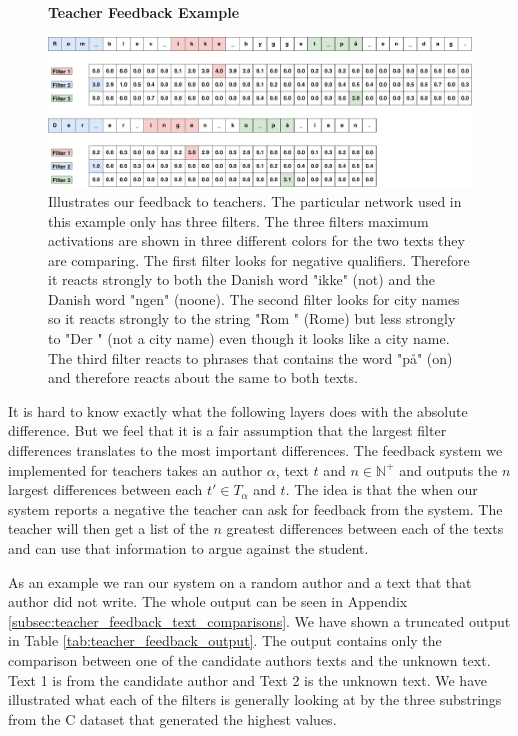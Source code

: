 \begin{figure}
    \centering
    \textbf{Teacher Feedback Example}\par\medskip
    \includegraphics[width=\textwidth]{./pictures/discussion/teacher_feedback_example}
    \caption{Illustrates our feedback to teachers. The
        particular network used in this example only has three filters. The
        three filters maximum activations are shown in three different colors
        for the two texts they are comparing. The first filter looks for
        negative qualifiers. Therefore it reacts strongly to both the Danish
        word "ikke" (not) and the Danish word "ngen" (noone). The second filter
        looks for city names so it reacts strongly to the string "Rom " (Rome)
        but less strongly to "Der " (not a city name) even though it looks like
        a city name. The third filter reacts to phrases that contains the word
        "p\aa " (on) and therefore reacts about the same to both texts.}
    \label{fig:feature_extraction_output_example}
\end{figure}

It is hard to know exactly what the following layers does with the absolute
difference. But we feel that it is a fair assumption that the largest filter
differences translates to the most important differences. The feedback system
we implemented for teachers takes an author $\alpha$, text $t$ and $n \in
\mathbb{N}^+$ and outputs the $n$ largest differences between each $t' \in
T_\alpha$ and $t$. The idea is that the when our system reports a negative the
teacher can ask for feedback from the system. The teacher will then get a list
of the $n$ greatest differences between each of the texts and can use that
information to argue against the student.

As an example we ran our system on a random author and a text that that
author did not write. The whole output can be seen in Appendix \ref{subsec:teacher_feedback_text_comparisons}. We have shown a truncated output
in Table \ref{tab:teacher_feedback_output}. The output contains only the
comparison between one of the candidate authors texts and the unknown text. Text
1 is from the candidate author and Text 2 is the unknown text. We have
illustrated what each of the filters is generally looking at by the three
substrings from the \gls{C} dataset that generated the highest values.

